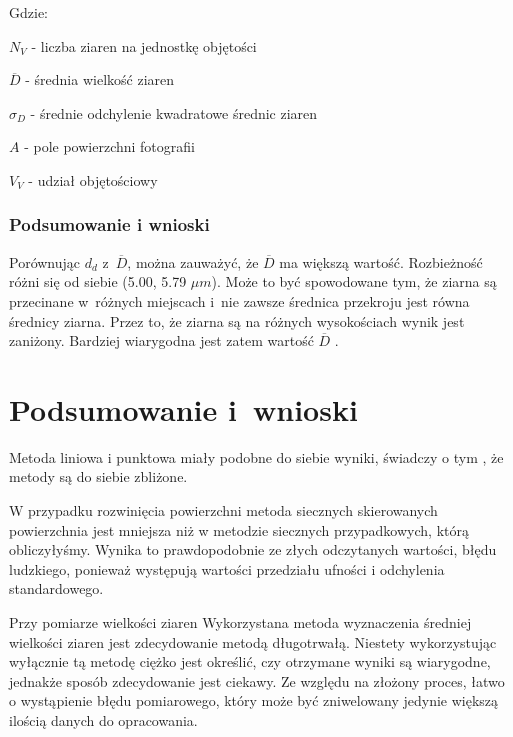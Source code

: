 \documentclass[a4paper,12pt]{article}
\begin{document}
Gdzie:

$N_V$ - liczba ziaren na jednostkę objętości

$\overline{D}$ - średnia wielkość ziaren

$\sigma_D$ - średnie odchylenie kwadratowe średnic ziaren

$A$ - pole powierzchni fotografii

$V_V$ - udział objętościowy
\newpage

{\color{purple}
\subsubsection{Podsumowanie i wnioski}

Porównując $d_d$ z~$\overline{D}$, można zauważyć, że $\overline{D}$ ma większą wartość. Rozbieżność różni się od siebie (5.00, 5.79 $\mu m$). Może to być spowodowane tym, że ziarna są  przecinane w~różnych miejscach i~nie zawsze średnica przekroju jest równa średnicy ziarna. Przez to, że ziarna są na różnych wysokościach wynik jest zaniżony. Bardziej wiarygodna jest zatem wartość $\overline{D}$ .}

\section{Podsumowanie i~wnioski}

{\color{purple}
Metoda liniowa i punktowa miały podobne do siebie wyniki, świadczy o tym , że metody są do siebie zbliżone.

W przypadku rozwinięcia powierzchni metoda siecznych skierowanych powierzchnia jest mniejsza niż w metodzie siecznych przypadkowych, którą obliczyłyśmy. Wynika to prawdopodobnie ze złych odczytanych wartości, błędu ludzkiego, ponieważ występują  wartości przedziału ufności i odchylenia standardowego.

Przy pomiarze wielkości ziaren Wykorzystana metoda wyznaczenia średniej wielkości ziaren jest zdecydowanie metodą długotrwałą. Niestety wykorzystując wyłącznie tą metodę ciężko jest określić, czy otrzymane
wyniki są wiarygodne, jednakże sposób zdecydowanie jest ciekawy. Ze względu na złożony proces, łatwo o wystąpienie błędu pomiarowego, który może być zniwelowany jedynie większą ilością danych do opracowania. }
\end{document}
